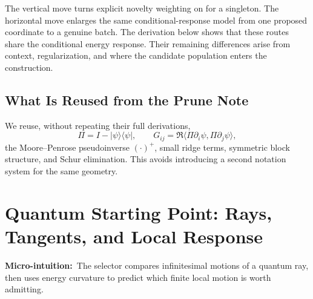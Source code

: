\documentclass[10pt,twocolumn]{article}
\newcommand{\ket}[1]{|#1\rangle}
\newcommand{\bra}[1]{\langle #1|}
\newcommand{\micro}[1]{\par\noindent\textbf{Micro-intuition:}\ #1\par}
\begin{document}
\begin{center}
\end{center}
The vertical move turns explicit novelty weighting on for a singleton. The
horizontal move enlarges the same conditional-response model from one proposed
coordinate to a genuine batch.
The derivation below shows that these routes share the conditional energy
response. Their remaining differences arise from context, regularization, and
where the candidate population enters the construction.

\subsection*{What Is Reused from the Prune Note}

We reuse, without repeating their full derivations,
\[
\Pi=I-\ket{\psi}\bra{\psi},
\qquad
G_{ij}=\Re\langle\Pi\partial_i\psi,\Pi\partial_j\psi\rangle,
\]
the Moore--Penrose pseudoinverse \((\cdot)^+\), small ridge terms, symmetric
block structure, and Schur elimination. This avoids introducing a second notation
system for the same geometry.

\section*{Quantum Starting Point: Rays, Tangents, and Local Response}

\micro{The selector compares infinitesimal motions of a quantum ray, then uses
energy curvature to predict which finite local motion is worth admitting.}
\end{document}
